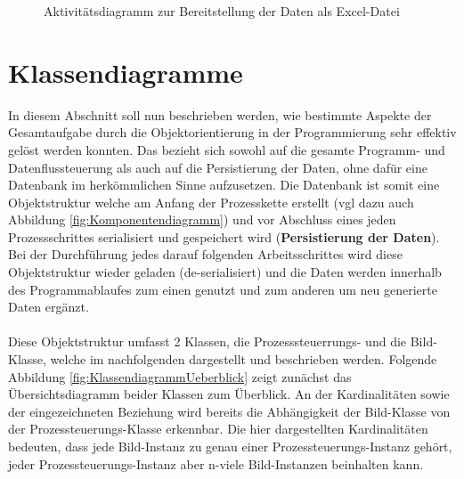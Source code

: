 \documentclass[
fontsize=10pt, 
listof = totoc,
parskip = half	
]{report}
\begin{document}
\begin{figure}[H]
	\centering
	\caption{Aktivitätsdiagramm zur Bereitstellung der Daten als Excel-Datei}
	\label{fig:FlowDatenbereitstellung}
\end{figure}

\section{Klassendiagramme}
\label{sec:Klassendiagramme}

In diesem Abschnitt soll nun beschrieben werden, wie bestimmte Aspekte der Gesamtaufgabe durch die Objektorientierung in der Programmierung sehr effektiv gelöst werden konnten. Das bezieht sich sowohl auf die gesamte Programm- und Datenflussteuerung als auch auf die Persistierung der Daten, ohne dafür eine Datenbank im herkömmlichen Sinne aufzusetzen. Die Datenbank ist somit eine Objektstruktur welche am Anfang der Prozesskette erstellt (vgl dazu auch Abbildung \ref{fig:Komponentendiagramm}) und vor Abschluss eines jeden Prozessschrittes serialisiert und gespeichert wird (\textbf{Persistierung der Daten}). Bei der Durchführung jedes darauf folgenden Arbeitsschrittes  wird diese Objektstruktur wieder geladen (de-serialisiert) und die Daten werden innerhalb des Programmablaufes zum einen genutzt und zum anderen um neu generierte Daten ergänzt.
\\\\
\noindent Diese Objektstruktur umfasst 2 Klassen, die Prozesssteuerrungs- und die Bild-Klasse, welche im nachfolgenden dargestellt und beschrieben werden. Folgende Abbildung \ref{fig:KlassendiagrammUeberblick}  zeigt zunächst das Übersichtsdiagramm beider Klassen zum Überblick. An der Kardinalitäten sowie der eingezeichneten Beziehung wird bereits die Abhängigkeit der Bild-Klasse von der Prozessteuerungs-Klasse erkennbar. Die hier dargestellten Kardinalitäten bedeuten, dass jede Bild-Instanz zu genau einer Prozessteuerungs-Instanz gehört, jeder Prozessteuerungs-Instanz aber n-viele Bild-Instanzen beinhalten kann.
\end{document}

